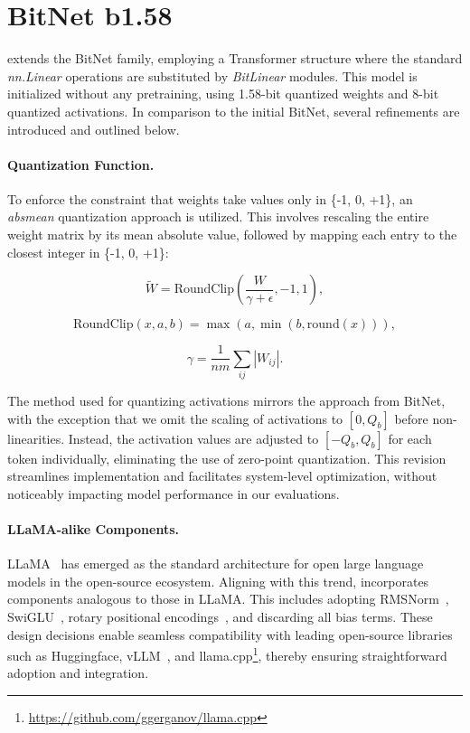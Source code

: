 \section{BitNet b1.58}

 extends the BitNet family, employing a Transformer structure where the standard \emph{nn.Linear} operations are substituted by \emph{BitLinear} modules. This model is initialized without any pretraining, using 1.58-bit quantized weights and 8-bit quantized activations. In comparison to the initial BitNet, several refinements are introduced and outlined below.

\paragraph{Quantization Function.} To enforce the constraint that weights take values only in \{-1, 0, +1\}, an \emph{absmean} quantization approach is utilized. This involves rescaling the entire weight matrix by its mean absolute value, followed by mapping each entry to the closest integer in \{-1, 0, +1\}:

\begin{equation}
    \widetilde{W} = \mathrm{RoundClip}(\frac{W}{\gamma + \epsilon}, -1, 1),
\end{equation}

\begin{equation}
    \mathrm{RoundClip}(x, a, b) = \max(a, \min(b, \mathrm{round}(x))),
\end{equation}

\begin{equation}
    \gamma = \frac{1}{nm}\sum_{ij} |W_{ij}|.
\end{equation}

The method used for quantizing activations mirrors the approach from BitNet, with the exception that we omit the scaling of activations to $[0, Q_b]$ before non-linearities. Instead, the activation values are adjusted to $[-Q_b, Q_b]$ for each token individually, eliminating the use of zero-point quantization. This revision streamlines implementation and facilitates system-level optimization, without noticeably impacting model performance in our evaluations.

\paragraph{LLaMA-alike Components.}

LLaMA~\cite{llama, llama2} has emerged as the standard architecture for open large language models in the open-source ecosystem. Aligning with this trend,  incorporates components analogous to those in LLaMA. This includes adopting RMSNorm~\cite{rmsnorm}, SwiGLU~\cite{swiglu}, rotary positional encodings~\cite{rope}, and discarding all bias terms. These design decisions enable seamless compatibility with leading open-source libraries such as Huggingface, vLLM~\cite{vllm}, and llama.cpp\footnote{\url{https://github.com/ggerganov/llama.cpp}}, thereby ensuring straightforward adoption and integration.

